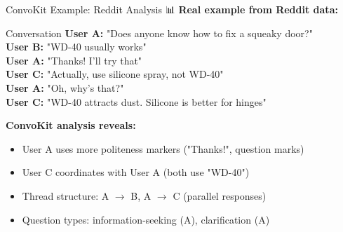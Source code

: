 \documentclass[aspectratio=169]{beamer}
\begin{document}
\begin{frame}{ConvoKit Example: Reddit Analysis 📊}
\small
    \textbf{Real example from Reddit data:}

    \vspace{0.3cm}

    \begin{block}{Conversation}
        \textbf{User A:} "Does anyone know how to fix a squeaky door?" \\
        \textbf{User B:} "WD-40 usually works" \\
        \textbf{User A:} "Thanks! I'll try that" \\
        \textbf{User C:} "Actually, use silicone spray, not WD-40" \\
        \textbf{User A:} "Oh, why's that?" \\
        \textbf{User C:} "WD-40 attracts dust. Silicone is better for hinges"
    \end{block}

    \vspace{0.3cm}

    \textbf{ConvoKit analysis reveals:}
    \begin{itemize}\setlength{\itemsep}{0pt}
        \item User A uses more politeness markers ("Thanks!", question marks)
        \item User C coordinates with User A (both use "WD-40")
        \item Thread structure: A $\rightarrow$ B, A $\rightarrow$ C (parallel responses)
        \item Question types: information-seeking (A), clarification (A)
    \end{itemize}
\end{frame}
\end{document}
